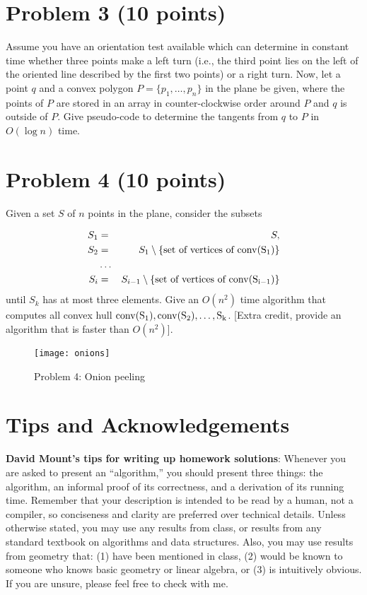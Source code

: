 \documentclass[11pt]{article}
\newcommand{\conv}[1]{\rm{conv}(#1)}
\begin{document}
\section*{Problem 3 (10 points)}

Assume you have an orientation test available which can determine in constant
time whether three points make a left turn (i.e., the third point lies on the
left of the oriented line described by the first two points) or a right turn.
Now, let a point $q$ and a convex polygon $P = \{ p_1, \ldots , p_n \}$ in the
plane be given, where the points of $P$ are stored in an array in
counter-clockwise order around $P$ and $q$ is outside of $P$. Give pseudo-code
to determine the tangents from $q$ to $P$ in $O(\log n)$ time.

\section*{Problem 4 (10 points)}

Given a set $S$ of $n$ points in the plane, consider the subsets

\begin{eqnarray*}
	S_1 &=& S, \\
	S_2 &=& S_1 \setminus \{ \text{set of vertices of } \conv{S_1} \} \\
		&\ldots& \\
	S_i &=& S_{i-1} \setminus \{ \text{set of vertices of } \conv{S_{i-1}} \}
\end{eqnarray*}
%
until $S_k$ has at most three elements.  Give an $O(n^2)$ time algorithm that
computes all convex hull $\conv{S_1}, \conv{S_2}, \ldots, S_k$.  [Extra credit,
provide an algorithm that is faster than $O(n^2)$].

\begin{figure}[h]
    \centering
    \texttt{[image: onions]}
    \caption{Problem 4: Onion peeling}
\end{figure}

\section*{Tips and Acknowledgements}

{\bf David Mount's tips for writing up homework solutions}: Whenever you are
asked to present an ``algorithm,'' you should present three things: the
algorithm, an informal proof of its correctness, and a derivation of its
running time.  Remember that your description is intended to be read by a
human, not a compiler, so conciseness and clarity are preferred over technical
details.  Unless otherwise stated, you may use any results from class, or
results from any standard textbook on algorithms and data structures. Also, you
may use results from geometry that: (1) have been mentioned in class, (2) would
be known to someone who knows basic geometry or linear algebra, or (3) is
intuitively obvious. If you are unsure, please feel free to check with me.
\end{document}
